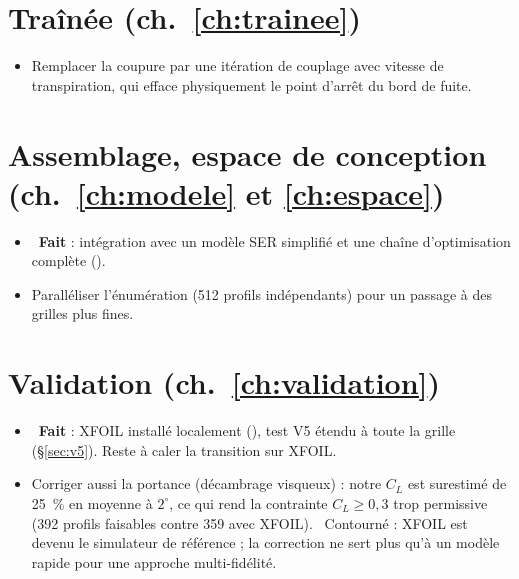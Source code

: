 \section*{Traînée (ch.~\ref{ch:trainee})}
\begin{itemize}
\item Remplacer la coupure  par une itération de couplage avec vitesse de transpiration, qui efface physiquement le point d'arrêt du bord de fuite.
\end{itemize}

\section*{Assemblage, espace de conception (ch.~\ref{ch:modele} et \ref{ch:espace})}
\begin{itemize}
\item {}~\textbf{Fait} : intégration avec un modèle SER simplifié et une chaîne d'optimisation complète ().
\item Paralléliser l'énumération (512 profils indépendants) pour un passage à des grilles plus fines.
\end{itemize}

\section*{Validation (ch.~\ref{ch:validation})}
\begin{itemize}
\item {}~\textbf{Fait} : XFOIL installé localement (), test V5 étendu à toute la grille (§\ref{sec:v5}). Reste à caler la transition sur XFOIL.
\item Corriger aussi la portance (décambrage visqueux) : notre $C_L$ est surestimé de 25~\% en moyenne à $2^\circ$, ce qui rend la contrainte $C_L\ge0{,}3$ trop permissive (392 profils faisables contre 359 avec XFOIL). ~Contourné : XFOIL est devenu le simulateur de référence ; la correction ne sert plus qu'à un modèle rapide pour une approche multi-fidélité.
\end{itemize}
